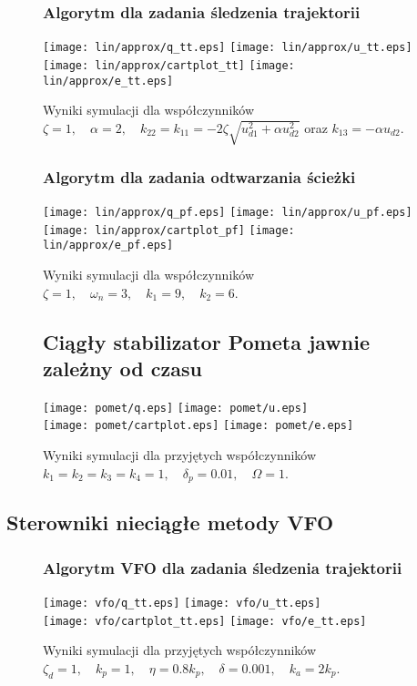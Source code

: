 \documentclass[12pt, a4paper, polish]{article}
\begin{document}
\begin{figure}[H]
	\subsubsection{Algorytm dla zadania śledzenia trajektorii}
\texttt{[image: lin/approx/q\_tt.eps]}
\texttt{[image: lin/approx/u\_tt.eps]}\\
\texttt{[image: lin/approx/cartplot\_tt]}	
\texttt{[image: lin/approx/e\_tt.eps]}
\caption{Wyniki symulacji dla współczynników $\zeta=1, \quad \alpha=2, \quad k_{22} = k_{11} = -2\zeta\sqrt{u_{d1}^2+\alpha u_{d2}^2}$ oraz $k_{13}=-\alpha u_{d2}$.}\end{figure}


\begin{figure}[H]
	\subsubsection{Algorytm dla zadania odtwarzania ścieżki}
	\texttt{[image: lin/approx/q\_pf.eps]}
	\texttt{[image: lin/approx/u\_pf.eps]}\\
	\texttt{[image: lin/approx/cartplot\_pf]}	
	\texttt{[image: lin/approx/e\_pf.eps]}
	\caption{Wyniki symulacji dla współczynników $\zeta=1, \quad \omega_n=3, \quad k_1 = 9, \quad k_2 = 6$.}\end{figure}


\begin{figure}[H]
\subsection{Ciągły stabilizator Pometa jawnie zależny od czasu}
	\texttt{[image: pomet/q.eps]}
	\texttt{[image: pomet/u.eps]}\\
	\texttt{[image: pomet/cartplot.eps]}	
	\texttt{[image: pomet/e.eps]}
	\caption{Wyniki symulacji dla przyjętych współczynników $k_1=k_2=k_3=k_4=1, \quad \delta_p=0.01, \quad \Omega=1$.}\end{figure}
\subsection{Sterowniki nieciągłe metody VFO}

\begin{figure}[H]
\subsubsection{Algorytm VFO dla zadania śledzenia trajektorii}
	\texttt{[image: vfo/q\_tt.eps]}
	\texttt{[image: vfo/u\_tt.eps]}\\
	\texttt{[image: vfo/cartplot\_tt.eps]}	
	\texttt{[image: vfo/e\_tt.eps]}
	\caption{Wyniki symulacji dla przyjętych współczynników $\zeta_d=1,\quad k_p =1, \quad \eta=0.8k_p,\quad \delta=0.001,\quad k_a=2k_p$.}\end{figure}
\end{document}

